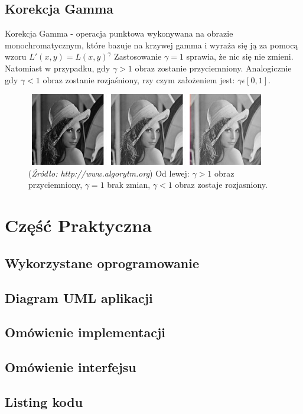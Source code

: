 \documentclass{article}
\begin{document}
        \subsection{Korekcja Gamma}
        {
            \Large
            \justifying
            \quad
            Korekcja Gamma - operacja punktowa wykonywana na obrazie monochromatycznym, które bazuje na krzywej gamma i wyraża się ją za pomocą wzoru \(L'(x,y) = L(x,y)^\gamma\)
            Zastosowanie \(\gamma = 1\) sprawia, że nic się nie zmieni.
            Natomiast w przypadku, gdy \(\gamma > 1\) obraz zostanie przyciemniony.
            Analogicznie gdy \(\gamma < 1\) obraz zostanie rozjaśniony, rzy czym założeniem jest: \(\gamma \epsilon \left[0,1\right]\).
        }        
        \begin{figure}[H]
            \centering
            \includegraphics[width=400px,height=120px]{korekcja_gamma_przyklad.jpg}
            \caption{(\textit{Źródło: http://www.algorytm.org}) Od lewej: \(\gamma > 1\) obraz przyciemniony, \(\gamma = 1\) brak zmian, \(\gamma < 1\) obraz zostaje rozjasniony.}
        \end{figure}
    \newpage
    \section{Część Praktyczna}
        \subsection{Wykorzystane oprogramowanie}
        \subsection{Diagram UML aplikacji}
        \subsection{Omówienie implementacji}
        \subsection{Omówienie interfejsu}
        \subsection{Listing kodu}
    \newpage
\end{document}
